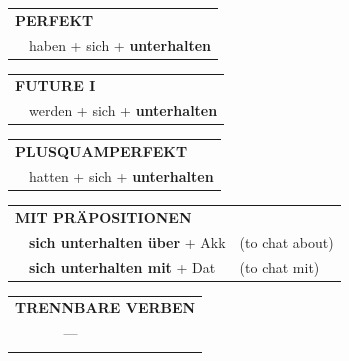 \documentclass[10pt,a4paper]{revtex4-2}
\begin{document}
\begin{verbbox}
 \begin{tabular}{rl}
     \multicolumn{2}{l}{\textbf{PERFEKT}}\\
    &haben + sich + \textbf{unterhalten}\\
  \end{tabular}
\hfill
   \begin{tabular}{rl}
   
    \multicolumn{2}{l}{\textbf{FUTURE I} }\\
    &werden + sich + \textbf{unterhalten}\\
 
  \end{tabular}
\hfill
   \begin{tabular}{rl}
      \multicolumn{2}{l}{\textbf{PLUSQUAMPERFEKT}}\\
    &hatten + sich + \textbf{unterhalten}\\
  \end{tabular}
  
\vspace{10pt}

   \begin{tabular}{lll}
      \multicolumn{3}{l}{\textbf{MIT PRÄPOSITIONEN}}\\
& \textbf{sich unterhalten über} + Akk & (to chat about)\\
& \textbf{sich unterhalten mit} + Dat & (to chat mit)\\
  \end{tabular}
 \hfill
   \begin{tabular}{lll}
      \multicolumn{3}{l}{\textbf{TRENNBARE VERBEN}}\\
      & --- &\\
\vspace{20pt}
  \end{tabular}
  
  \vspace{-5pt}

\end{verbbox}
\end{document}
